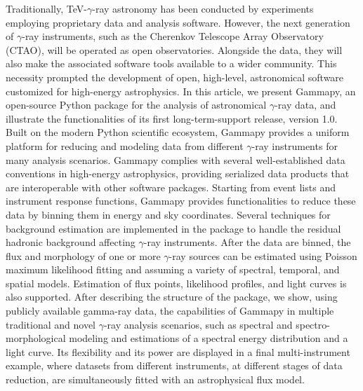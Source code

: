 \documentclass[longauth]{aa}
\newcommand{\gammapy}{Gammapy\xspace}
\newcommand{\gammaray}{$\gamma$-ray\xspace}
\begin{document}
\abstract
        {
                Traditionally, TeV-\gammaray astronomy has been conducted
                by experiments employing proprietary data and analysis software.
                However, the next generation of \gammaray instruments,
                such as the Cherenkov Telescope Array Observatory (CTAO), will be operated as open observatories.
                Alongside the data, they will also make the associated software tools available to a wider community.
    This necessity prompted the development of open, high-level, astronomical software customized for high-energy astrophysics.
        }
        {
                In this article, we present \gammapy, an open-source Python package for the analysis of astronomical \gammaray data,
                and illustrate the functionalities of its first long-term-support release, version 1.0.
                Built on the modern Python scientific ecosystem, \gammapy provides a uniform platform for reducing and
                modeling data from different \gammaray instruments for many analysis scenarios.
    \gammapy complies with several well-established data conventions in high-energy astrophysics, providing serialized data products that
                are interoperable with other software packages.
        }
        {
                Starting from event lists and instrument response functions,
                \gammapy provides functionalities to reduce these data by binning them in energy and sky coordinates.
                Several techniques for background estimation are implemented in the package to handle the residual hadronic background affecting \gammaray instruments.
                After the data are binned, the flux and morphology of one or more \gammaray sources can be estimated
                using Poisson maximum likelihood fitting
                and assuming a variety of spectral, temporal, and spatial models.
                Estimation of flux points, likelihood profiles, and light curves is also supported.
        }
        {
                After describing the structure of the package, we show, using publicly available gamma-ray data,
                the capabilities of \gammapy in multiple traditional and novel \gammaray analysis scenarios,
                such as spectral and spectro-morphological modeling and estimations of a spectral energy
                distribution and a light curve.
                Its flexibility and its power are displayed in a final multi-instrument example,
                where datasets from different instruments, at different stages of data reduction,
                are simultaneously fitted with an astrophysical flux model.
        }{}
\end{document}
